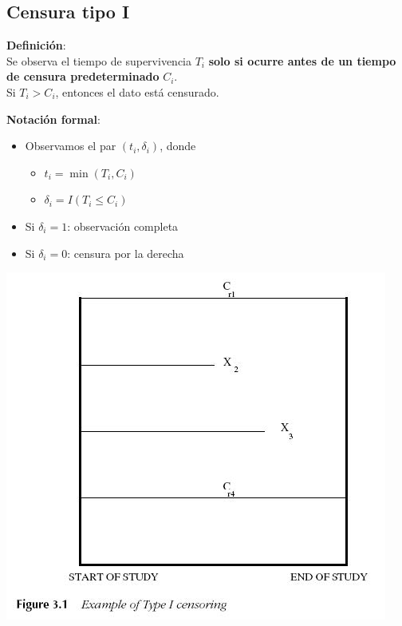 \documentclass[
  letterpaper,
  DIV=11,
  numbers=noendperiod]{scrartcl}
\providecommand{\tightlist}{%
  \setlength{\itemsep}{0pt}\setlength{\parskip}{0pt}}
\begin{document}
\subsection{Censura tipo I}\label{censura-tipo-i}

\textbf{Definición}:\\
Se observa el tiempo de supervivencia \(T_i\) \textbf{solo si ocurre
antes de un tiempo de censura predeterminado} \(C_i\).\\
Si \(T_i > C_i\), entonces el dato está censurado.

\textbf{Notación formal}:

\begin{itemize}
\tightlist
\item
  Observamos el par \((t_i, \delta_i)\), donde

  \begin{itemize}
  \tightlist
  \item
    \(t_i = \min(T_i, C_i)\)\\
  \item
    \(\delta_i = I(T_i \le C_i)\)\\
  \end{itemize}
\item
  Si \(\delta_i = 1\): observación completa\\
\item
  Si \(\delta_i = 0\): censura por la derecha
\end{itemize}

\begin{center}
\includegraphics[width=0.9\linewidth,height=\textheight,keepaspectratio]{figura/CensuraI.jpg}
\end{center}
\end{document}
